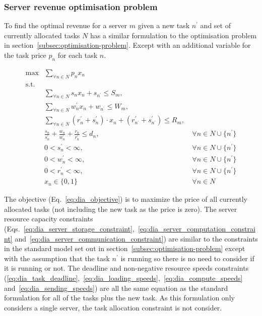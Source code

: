 \subsubsection{Server revenue optimisation problem}\label{subsubsec:decentralised_iterative_problem}
To find the optimal revenue for a server $m$ given a new task $n^{'}$ and set of currently allocated tasks $N$ has a
similar formulation to the optimisation problem in section~\ref{subsec:optimisation-problem}. Except with an additional
variable for the task price $p_n$ for each task $n$.

\begin{align}
    \max & \sum_{\forall n \in N} p_n x_n\label{eq:dia_objective}\\
    \mbox{s.t.} \nonumber \\
    & \sum_{\forall n \in N} s_n x_n + s_{n^{'}} \leq S_m,\label{eq:dia_server_storage_constraint}\\
    & \sum_{\forall n \in N} w^{'}_n x_n + w_{n^{'}} \leq W_m, \label{eq:dia_server_computation_constraint}\\
    & \sum_{\forall n \in N} (r^{'}_n + s^{'}_n) \cdot x_n + (r^{'}_{n^{'}} + s^{'}_{n^{'}}) \leq R_m, \label{eq:dia_server_communication_constraint}\\
    & \frac{s_n}{s^{'}_n} + \frac{w_n}{w^{'}_n} + \frac{r_n}{r^{'}_n} \leq d_n, &~ \forall n \in N \cup \{n^{'}\} \label{eq:dia_task_deadline}\\
    & 0 < s^{'}_n < \infty, &~ \forall{n \in N \cup \{n^{'}\}} \label{eq:dia_loading_speeds}\\
    & 0 < w^{'}_n < \infty, &~ \forall{n \in N \cup \{n^{'}\}} \label{eq:dia_compute_speeds}\\
    & 0 < r^{'}_n < \infty, &~ \forall{n \in N \cup \{n^{'}\}} \label{eq:dia_sending_speeds}\\
    & x_n \in \{0,1\} &~ \forall{n \in N} \label{eq:dia_job_allocation}
\end{align}

The objective (Eq.~\eqref{eq:dia_objective}) is to maximize the price of all currently allocated tasks (not including
the new task as the price is zero). The server resource capacity constraints
(Eqs.~\eqref{eq:dia_server_storage_constraint},~\eqref{eq:dia_server_computation_constraint}
and~\eqref{eq:dia_server_communication_constraint}) are similar to the constraints in the standard model set out in
section~\ref{subsec:optimisation-problem} except with the assumption that the task $n^{'}$ is running so there is no
need to consider if it is running or not. The deadline and non-negative resource speeds constraints
(\ref{eq:dia_task_deadline},~\ref{eq:dia_loading_speeds},~\ref{eq:dia_compute_speeds} and~\ref{eq:dia_sending_speeds})
are all the same equation as the standard formulation for all of the tasks plus the new task. As this formulation only
considers a single server, the task allocation constraint is not consider.

